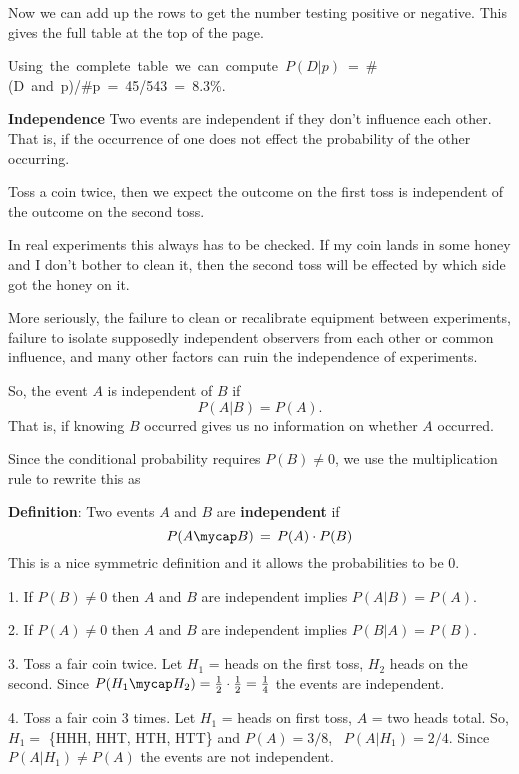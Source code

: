 Now we can add up the rows to get the number testing positive or negative. 
This gives the full table at the top of the page.

\mbox{Using the complete table we can compute 
$P(D|p) $ =  \#(D and p)/\#p = 45/543 = 8.3\%.}

\medskip

\textbf{Independence}
Two events are independent if they don't influence each other. That is,
if the occurrence of one does not effect the probability of the other
occurring.

\example Toss a coin twice, then we expect the outcome on the first toss 
is independent of the outcome on the second toss.

In real experiments this always has to be checked. If my coin lands in some
honey and I don't bother to clean it, then the second toss will be effected
by which side got the honey on it.

More seriously, the failure to clean or recalibrate equipment between 
experiments, failure
to isolate supposedly independent observers from each other or common influence,
and many other factors can ruin the independence of experiments.

So, the event $A$ is independent of $B$ if 
\[P(A|B) = P(A).\]
That is, if knowing $B$ occurred  gives us no information on whether $A$
occurred.

Since the conditional probability requires $P(B) \ne 0$, we use the 
multiplication rule to rewrite this as

\cont 

\textbf{Definition}: Two events $A$ and $B$ are \textbf{independent} if
\begin{equation}\label{ind}
P(A\mycap B) \, = \, P(A)\cdot P(B)
\end{equation}
This is a nice symmetric definition and it allows the probabilities to be 0.

\examples{}
1. If $P(B)\ne 0$ then $A$ and $B$ are independent implies $P(A|B) = P(A)$.

2. If $P(A)\ne 0$ then $A$ and $B$ are independent implies $P(B|A) = P(B)$.

3. Toss a fair coin twice. 
Let $H_1$ = heads on the first toss, $H_2$ heads on
the second. Since $P(H_1\mycap H_2) = \frac12\cdot\frac12 = \frac14$ the
events are independent.

4. Toss a fair coin 3 times. 
Let $H_1$ = heads on first toss, $A$ = two heads total.
So, $H_1 = $ \{HHH, HHT, HTH, HTT\} and $P(A) = 3/8$, \, $P(A|H_1) = 2/4$. 
Since $P(A|H_1) \ne P(A)$ the events are not independent.

